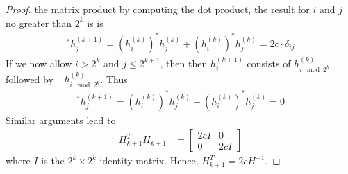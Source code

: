 \documentclass[12pt]{article}
\newenvironment{sol}[1][Solution]{\begin{trivlist}
		\item[\hskip \labelsep {\bfseries #1:}]}{\end{trivlist}}
\begin{document}
\begin{sol}
\begin{proof}
		the matrix product by computing the dot product, the result for $i$ and $j$ no greater
		than $2^k$ is is
		\begin{align*}
			[h^{(k+1)}_i]^*h^{(k+1)}_j = (h^{(k)}_i)^*h^{(k)}_j + (h^{(k)}_i)^*h^{(k)}_j = 2c\cdot \delta_{ij}
		\end{align*}
		If we now allow $i>2^k$ and $j\leq 2^{k+1}$, then then $h^{(k+1)}_i$ consists of
		$h^{(k)}_{i\mod 2^k}$ followed by $-h^{(k)}_{i\mod 2^k}$. Thus
		\begin{align*}
			[h^{(k+1)}_i]^*h^{(k+1)}_j = (h^{(k)}_i)^*h^{(k)}_j - (h^{(k)}_i)^*h^{(k)}_j = 0
		\end{align*}
		Similar arguments lead to
		\begin{align*}
			H_{k+1}^TH_{k+1} &= \begin{bmatrix}
				2cI & 0\\
				0 & 2cI
			\end{bmatrix}
		\end{align*}
		where $I$ is the $2^k\times 2^k$ identity matrix. Hence, $H^{T}_{k+1}=2cH^{-1}$. 
	\end{proof}
\end{sol}
\end{document}
